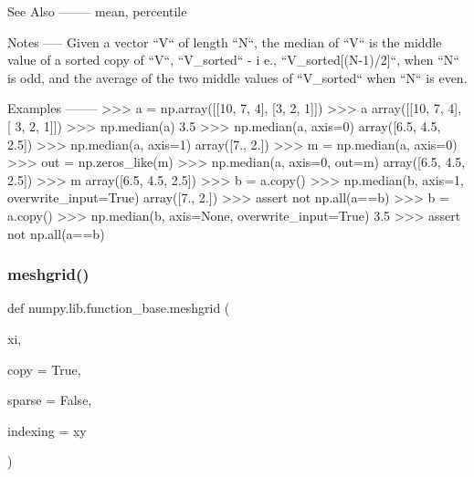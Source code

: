 \begin{DoxyVerb}
See Also
--------
mean, percentile

Notes
-----
Given a vector ``V`` of length ``N``, the median of ``V`` is the
middle value of a sorted copy of ``V``, ``V_sorted`` - i
e., ``V_sorted[(N-1)/2]``, when ``N`` is odd, and the average of the
two middle values of ``V_sorted`` when ``N`` is even.

Examples
--------
>>> a = np.array([[10, 7, 4], [3, 2, 1]])
>>> a
array([[10,  7,  4],
       [ 3,  2,  1]])
>>> np.median(a)
3.5
>>> np.median(a, axis=0)
array([6.5, 4.5, 2.5])
>>> np.median(a, axis=1)
array([7.,  2.])
>>> m = np.median(a, axis=0)
>>> out = np.zeros_like(m)
>>> np.median(a, axis=0, out=m)
array([6.5,  4.5,  2.5])
>>> m
array([6.5,  4.5,  2.5])
>>> b = a.copy()
>>> np.median(b, axis=1, overwrite_input=True)
array([7.,  2.])
>>> assert not np.all(a==b)
>>> b = a.copy()
>>> np.median(b, axis=None, overwrite_input=True)
3.5
>>> assert not np.all(a==b)\end{DoxyVerb}
 \mbox{\label{namespacenumpy_1_1lib_1_1function__base_adc928993b52eacb44250ab13da5b65f1}} 
\subsubsection{\texorpdfstring{meshgrid()}{meshgrid()}}
{\footnotesize\ttfamily def numpy.\+lib.\+function\+\_\+base.\+meshgrid (\begin{DoxyParamCaption}\item[{}]{xi,  }\item[{}]{copy = {\ttfamily True},  }\item[{}]{sparse = {\ttfamily False},  }\item[{}]{indexing = {\ttfamily \textquotesingle{}xy\textquotesingle{}} }\end{DoxyParamCaption})}

